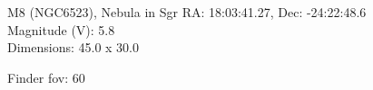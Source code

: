 \begin{block}{M8 (NGC6523), Nebula in Sgr}
    RA: 18:03:41.27, Dec: -24:22:48.6 \\ 
    Magnitude (V): 5.8 \\ 
    Dimensions: 45.0 x 30.0 

    Finder fov: 60 
\end{block}